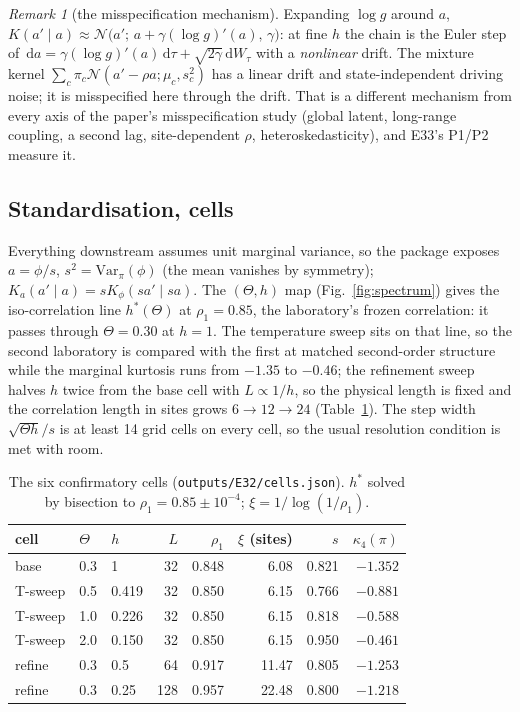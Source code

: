 \documentclass[10pt,a4paper]{article}
\newcommand{\Th}{\Theta}
\newcommand{\code}[1]{\texttt{\small #1}}
\newcommand{\dd}{\,\mathrm{d}}
\newcommand{\Nn}{\mathcal{N}}
\theoremstyle{plain}
\theoremstyle{remark}
\newtheorem{remark}[proposition]{Remark}
\begin{document}
\begin{remark}[the misspecification mechanism]
Expanding $\log g$ around $a$, $K(a'\mid a)\approx\Nn\!\big(a';\,a+\gamma(\log g)'(a),\,\gamma\big)$:
at fine $h$ the chain is the Euler step of $\dd a=\gamma(\log g)'(a)\dd\tau+\sqrt{2\gamma}\dd W_\tau$ with a
\emph{nonlinear} drift. The mixture kernel $\sum_c\pi_c\Nn(a'-\rho a;\mu_c,s_c^2)$ has a
linear drift and state-independent driving noise; it is misspecified here through the drift. That is
a different mechanism from every axis of the paper's misspecification study (global latent,
long-range coupling, a second lag, site-dependent $\rho$, heteroskedasticity), and E33's P1/P2 measure it.
\end{remark}

\subsection{Standardisation, cells}

Everything downstream assumes unit marginal variance, so the package exposes $a=\phi/s$,
$s^2=\mathrm{Var}_\pi(\phi)$ (the mean vanishes by symmetry); $K_a(a'\mid a)=sK_\phi(sa'\mid sa)$. The
$(\Th,h)$ map (Fig.~\ref{fig:spectrum}) gives the iso-correlation line $h^*(\Th)$ at $\rho_1=0.85$, the
laboratory's frozen correlation: it passes through $\Th=0.30$ at $h=1$. The temperature sweep sits
on that line, so the second laboratory is compared with the first at matched second-order
structure while the marginal kurtosis runs from $-1.35$ to $-0.46$; the refinement sweep halves $h$
twice from the base cell with $L\propto1/h$, so the physical length is fixed and the correlation
length in sites grows $6\to12\to24$ (Table~\ref{tab:cells}). The step width $\sqrt{\Th h}/s$ is at least
14 grid cells on every cell, so the usual resolution condition is met with room.

\begin{table}[h]\centering\footnotesize
\begin{tabular}{@{}l l l r r r r r@{}}
\toprule
cell & $\Th$ & $h$ & $L$ & $\rho_1$ & $\xi$ (sites) & $s$ & $\kappa_4(\pi)$ \\
\midrule
base      & 0.3 & 1      & 32  & 0.848 & 6.08  & 0.821 & $-1.352$ \\
T-sweep   & 0.5 & 0.419  & 32  & 0.850 & 6.15  & 0.766 & $-0.881$ \\
T-sweep   & 1.0 & 0.226  & 32  & 0.850 & 6.15  & 0.818 & $-0.588$ \\
T-sweep   & 2.0 & 0.150  & 32  & 0.850 & 6.15  & 0.950 & $-0.461$ \\
refine    & 0.3 & 0.5    & 64  & 0.917 & 11.47 & 0.805 & $-1.253$ \\
refine    & 0.3 & 0.25   & 128 & 0.957 & 22.48 & 0.800 & $-1.218$ \\
\bottomrule
\end{tabular}
\caption{The six confirmatory cells (\code{outputs/E32/cells.json}). $h^*$ solved by bisection to
$\rho_1=0.85\pm10^{-4}$; $\xi=1/\log(1/\rho_1)$.}
\label{tab:cells}
\end{table}
\end{document}
